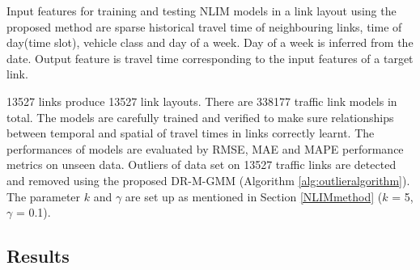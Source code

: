 \documentclass[journal]{IEEEtran}
\begin{document}
Input features for training and testing NLIM models in a link layout using the proposed method are sparse historical travel time of neighbouring links, time of day(time slot), vehicle class and day of a week. Day of a week is inferred from the date. Output feature is travel time corresponding to the input features of a target link.

13527 links produce 13527 link layouts. There are 338177 traffic link models in total. The models  are carefully trained and verified to make sure relationships between temporal and spatial of travel times in links correctly learnt. The performances of models are evaluated by RMSE, MAE and MAPE performance metrics on unseen data. Outliers of data set on 13527 traffic links are detected and removed using the proposed DR-M-GMM (Algorithm \ref{alg:outlieralgorithm}). The parameter $k$ and $\gamma$ are set up as mentioned in Section \ref{NLIMmethod} ($k$ = 5, $\gamma$ = 0.1).

\subsection{Results}
\end{document}
